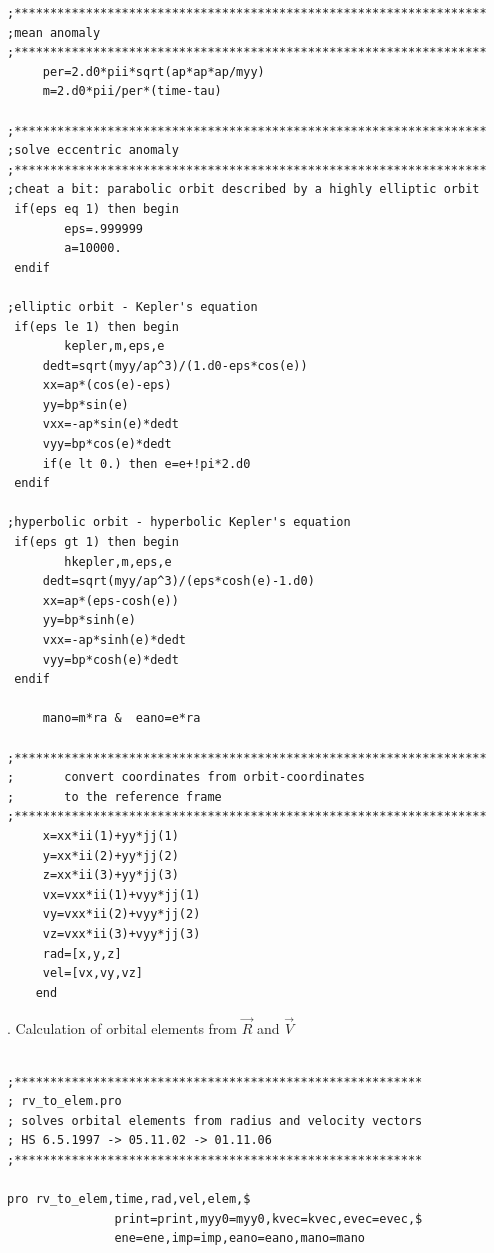 \documentclass[a4paper,12pt]{article}
\def\red{\color{red}}
\def\black{\color{RGBblack}}
\begin{document}
{{{\begin{verbatim}
;******************************************************************
;mean anomaly
;******************************************************************
     per=2.d0*pii*sqrt(ap*ap*ap/myy)
     m=2.d0*pii/per*(time-tau)

;******************************************************************
;solve eccentric anomaly
;******************************************************************
;cheat a bit: parabolic orbit described by a highly elliptic orbit
 if(eps eq 1) then begin
        eps=.999999
        a=10000.
 endif

;elliptic orbit - Kepler's equation
 if(eps le 1) then begin
        kepler,m,eps,e
     dedt=sqrt(myy/ap^3)/(1.d0-eps*cos(e))
     xx=ap*(cos(e)-eps)
     yy=bp*sin(e)
     vxx=-ap*sin(e)*dedt
     vyy=bp*cos(e)*dedt
     if(e lt 0.) then e=e+!pi*2.d0
 endif

;hyperbolic orbit - hyperbolic Kepler's equation
 if(eps gt 1) then begin
        hkepler,m,eps,e
     dedt=sqrt(myy/ap^3)/(eps*cosh(e)-1.d0)
     xx=ap*(eps-cosh(e))
     yy=bp*sinh(e)
     vxx=-ap*sinh(e)*dedt
     vyy=bp*cosh(e)*dedt
 endif

     mano=m*ra &  eano=e*ra

;******************************************************************
;       convert coordinates from orbit-coordinates
;       to the reference frame
;******************************************************************
     x=xx*ii(1)+yy*jj(1)
     y=xx*ii(2)+yy*jj(2)
     z=xx*ii(3)+yy*jj(3)
     vx=vxx*ii(1)+vyy*jj(1)
     vy=vxx*ii(2)+vyy*jj(2)
     vz=vxx*ii(3)+vyy*jj(3)
     rad=[x,y,z]
     vel=[vx,vy,vz]
    end
\end{verbatim}

\newpage
\black

{. Calculation of orbital elements from ${\vec R}$ and ${\vec V}$}

{\red \scriptsize
\begin{verbatim}

;*********************************************************
; rv_to_elem.pro
; solves orbital elements from radius and velocity vectors
; HS 6.5.1997 -> 05.11.02 -> 01.11.06
;*********************************************************

pro rv_to_elem,time,rad,vel,elem,$
               print=print,myy0=myy0,kvec=kvec,evec=evec,$
               ene=ene,imp=imp,eano=eano,mano=mano


\end{verbatim}}}}}
\end{document}
